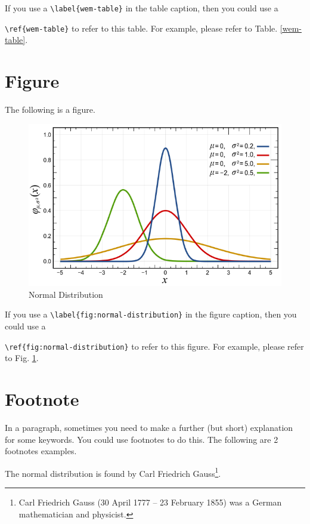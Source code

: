 \documentclass[10pt, a4paper, oneside]{book}
\begin{document}
If you use a \texttt{\textbackslash{}label\{wem-table\}} in the table caption, then you could use a

\texttt{\textbackslash{}ref\{wem-table\}} to refer to this table.
For example, please refer to Table. \ref{wem-table}.

\clearpage

\section{Figure}\label{figure}

The following is a figure.

\begin{figure}[htbp]
\centering
\includegraphics{./normal-distribution.png}
\caption{Normal Distribution \label{fig:normal-distribution}}
\end{figure}

If you use a \texttt{\textbackslash{}label\{fig:normal-distribution\}} in the figure caption, then you could use a

\texttt{\textbackslash{}ref\{fig:normal-distribution\}} to refer to this figure.
For example, please refer to Fig. \ref{fig:normal-distribution}.

\section{Footnote}\label{footnote}

In a paragraph, sometimes you need to make a further (but short) explanation for some keywords.
You could use footnotes to do this. The following are 2 footnotes examples.

The normal distribution is found by Carl Friedrich Gauss\footnote{Carl Friedrich Gauss (30 April 1777 -- 23 February 1855) was a German mathematician and physicist.}.
\end{document}
